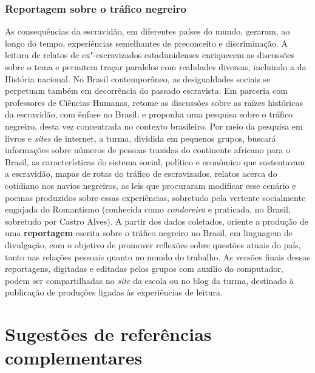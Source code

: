 \documentclass[12pt]{extarticle}
\begin{document}
\subsubsection{Reportagem sobre o tráfico negreiro}


As consequências da escravidão, em diferentes países do mundo,
geraram, ao longo do tempo, experiências semelhantes de preconceito e
discriminação. A leitura de relatos de ex"-escravizados estadunidenses
enriquecem as discussões sobre o tema e permitem traçar paralelos com
realidades diversas, incluindo a da História nacional. No Brasil
contemporâneo, as desigualdades sociais se perpetuam também em
decorrência do passado escravista. Em parceria com professores de
Ciências Humanas, retome as discussões sobre as raízes históricas da
escravidão, com ênfase no Brasil, e proponha uma pesquisa sobre o
tráfico negreiro, desta vez concentrada no contexto brasileiro. Por
meio da pesquisa em livros e \emph{sites} de internet, a turma,
dividida em pequenos grupos, buscará informações sobre números de
pessoas trazidas do continente africano para o Brasil, as
características do sistema social, político e econômico que
sustentavam a escravidão, mapas de rotas do tráfico de escravizados,
relatos acerca do cotidiano nos navios negreiros, as leis que
procuraram modificar esse cenário e poemas produzidos sobre essas
experiências, sobretudo pela vertente socialmente engajada do
Romantismo (conhecida como \emph{condoreira} e praticada, no Brasil,
sobretudo por Castro Alves). A partir dos dados coletados, oriente a
produção de uma \textbf{reportagem} escrita sobre o tráfico negreiro
no Brasil, em linguagem de divulgação, com o objetivo de promover
reflexões sobre questões atuais do país, tanto nas relações pessoais
quanto no mundo do trabalho. As versões finais dessas reportagens,
digitadas e editadas pelos grupos com auxílio do computador, podem ser
compartilhadas no \emph{site} da escola ou no blog da turma, destinado
à publicação de produções ligadas às experiências de leitura.


\section{Sugestões de referências complementares}\label{sugestoes}
\end{document}

